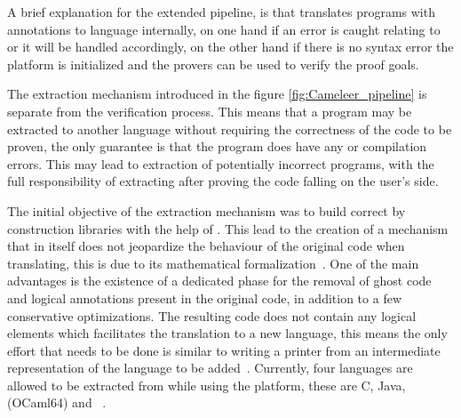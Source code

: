 A brief explanation for the extended \cameleer pipeline, is that \cameleer translates \ocaml programs with \gospel annotations to 
\whyml language internally, on one hand if an error is caught relating to \ocaml or \whyml it will be handled accordingly, on the 
other hand if there is no syntax error the \whythree platform is initialized and the provers can be used to verify the proof goals.

The extraction mechanism introduced in the figure \ref{fig:Cameleer_pipeline} is separate from the verification process.
This means that a program may be extracted to another language without requiring the correctness of the code to be proven, 
the only guarantee is that the program does have any \ocaml or \gospel compilation errors. 
This may lead to extraction of potentially incorrect \ocaml programs, with the full responsibility of extracting after proving the
code falling on the user's side. 

The initial objective of the extraction mechanism was to build correct by construction libraries with the help of \whythree. This lead
to the creation of a mechanism that in itself does not jeopardize the behaviour of the original code when translating, this is due to its 
mathematical formalization~\cite{Pereira18}. One of the main advantages is the existence of a dedicated phase for the removal of ghost code and logical
annotations present in the original \whyml code, in addition to a few conservative optimizations. The resulting code does not contain 
any logical elements which facilitates the translation to a new language, this means the only effort that needs to be done
is similar to writing a printer from an intermediate representation of the language to be added~\cite{Pereira18}. Currently, four languages 
are allowed to be extracted from \whyml while using the \whythree platform, these are C, Java, \ocaml (OCaml64) and 
\cml~\cite{Why3Extract, Pereira18}.